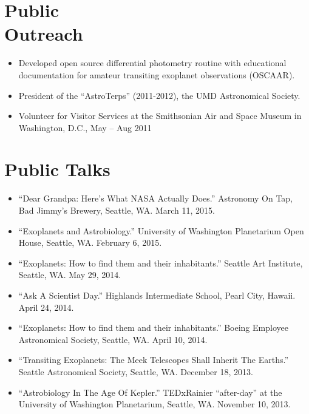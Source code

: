 \documentclass[margin]{res}
\begin{document}
\begin{resume}
\section{Public \\ Outreach}             
\begin{itemize}
\item Developed open source differential photometry routine with educational documentation for amateur transiting exoplanet observations (OSCAAR).

\item President of the ``AstroTerps'' (2011-2012), the UMD Astronomical Society.

\item Volunteer for Visitor Services at the Smithsonian Air and Space Museum in Washington, D.C., May -- Aug 2011\\
\end{itemize}


\section{Public Talks}
\begin{itemize}
\item ``Dear Grandpa: Here's What NASA Actually Does.'' Astronomy On Tap, Bad Jimmy's Brewery, Seattle, WA. March 11, 2015.

\item ``Exoplanets and Astrobiology.'' University of Washington Planetarium Open House, Seattle, WA. February 6, 2015.

\item ``Exoplanets: How to find them and their inhabitants.'' Seattle Art Institute, Seattle, WA. May 29, 2014.

\item ``Ask A Scientist Day.'' Highlands Intermediate School, Pearl City, Hawaii. April 24, 2014.

\item ``Exoplanets: How to find them and their inhabitants.'' Boeing Employee Astronomical Society, Seattle, WA. April 10, 2014.

\item ``Transiting Exoplanets: The Meek Telescopes Shall Inherit The Earths.'' Seattle Astronomical Society, Seattle, WA. December 18, 2013.

\item ``Astrobiology In The Age Of Kepler.'' TEDxRainier ``after-day'' at the University of Washington Planetarium, Seattle, WA. November 10, 2013. 


\end{itemize}
\end{resume}
\end{document}
